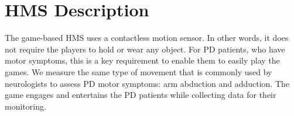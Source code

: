 \documentclass[10pt, conference, compsocconf]{IEEEtran}
\begin{document}





\section{HMS Description}\label{sec:proposedsystem}

The game-based HMS uses a contactless motion sensor. In other words, it does not require the players to hold or wear any object. For PD patients, who have motor symptoms, this is a key requirement to enable them to easily play the games. We measure the same type of movement that is commonly used by neurologists to assess PD motor symptoms: arm abduction and adduction. The game engages and entertains the PD patients while collecting data for their monitoring.
\end{document}
